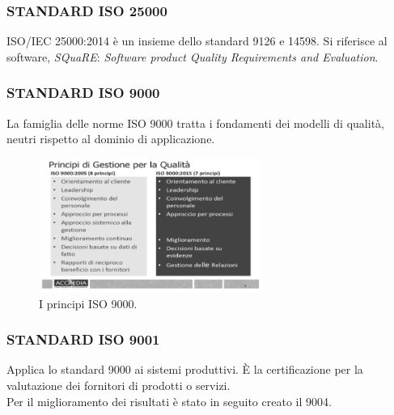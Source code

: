 			\subsubsection{STANDARD ISO 25000}		\label{2500}
			ISO/IEC 25000:2014 è un insieme dello standard 9126 e 14598.
			Si riferisce al software, \textit{SQuaRE}: \textit{Software product Quality Requirements and Evaluation}.


			\subsubsection{STANDARD ISO 9000}		\label{9000}
			La famiglia delle norme ISO 9000 tratta i fondamenti dei modelli di qualità, neutri rispetto al dominio di applicazione.

			\begin{figure}[H]
				\centering
				\includegraphics[width=0.65\textwidth]{img/9000}
				\caption{I principi ISO 9000.}
			\end{figure}


			\subsubsection{STANDARD ISO 9001}		\label{9001}
			Applica lo standard 9000 ai sistemi produttivi. È la certificazione per la valutazione dei fornitori di prodotti o servizi. \\
			Per il miglioramento dei risultati è stato in seguito creato il 9004.


